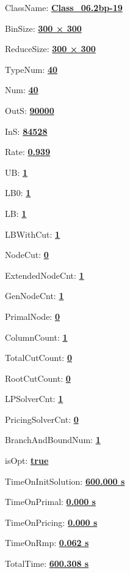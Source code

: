 \documentclass[11pt]{article}
\begin{document}
\pagestyle{empty}


ClassName: \underline{\textbf{Class_06.2bp-19}}
\par
BinSize: \underline{\textbf{300 × 300}}
\par
ReduceSize: \underline{\textbf{300 × 300}}
\par
TypeNum: \underline{\textbf{40}}
\par
Num: \underline{\textbf{40}}
\par
OutS: \underline{\textbf{90000}}
\par
InS: \underline{\textbf{84528}}
\par
Rate: \underline{\textbf{0.939}}
\par
UB: \underline{\textbf{1}}
\par
LB0: \underline{\textbf{1}}
\par
LB: \underline{\textbf{1}}
\par
LBWithCut: \underline{\textbf{1}}
\par
NodeCut: \underline{\textbf{0}}
\par
ExtendedNodeCnt: \underline{\textbf{1}}
\par
GenNodeCnt: \underline{\textbf{1}}
\par
PrimalNode: \underline{\textbf{0}}
\par
ColumnCount: \underline{\textbf{1}}
\par
TotalCutCount: \underline{\textbf{0}}
\par
RootCutCount: \underline{\textbf{0}}
\par
LPSolverCnt: \underline{\textbf{1}}
\par
PricingSolverCnt: \underline{\textbf{0}}
\par
BranchAndBoundNum: \underline{\textbf{1}}
\par
isOpt: \underline{\textbf{true}}
\par
TimeOnInitSolution: \underline{\textbf{600.000 s}}
\par
TimeOnPrimal: \underline{\textbf{0.000 s}}
\par
TimeOnPricing: \underline{\textbf{0.000 s}}
\par
TimeOnRmp: \underline{\textbf{0.062 s}}
\par
TotalTime: \underline{\textbf{600.308 s}}
\par
\newpage
\end{document}
